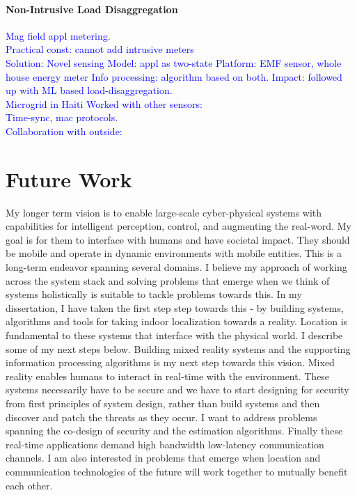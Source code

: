 \documentclass[10pt]{article}
\begin{document}
\paragraph{Non-Intrusive Load Disaggregation}
\textcolor{blue}{
Mag field appl metering.\\
Practical const: cannot add intrusive meters\\
Solution: Novel sensing
Model: appl as two-state
Platform: EMF sensor, whole house energy meter
Info processing: algorithm based on both.
Impact: followed up with ML based load-disaggregation.\\
Microgrid in Haiti
Worked with other sensors:\\
Time-sync, mac protocols.\\
Collaboration with outside:}

\section{Future Work}
My longer term vision is to enable large-scale cyber-physical systems with capabilities for intelligent perception, control, and augmenting the real-word. My goal is for them to interface with humans and have societal impact. They should be mobile and operate in dynamic environments with mobile entities. This is a long-term endeavor spanning several domains. I believe my approach of working across the system stack and solving problems that emerge when we think of systems holistically is suitable to tackle problems towards this. In my dissertation, I have taken the first step step towards this - by building systems, algorithms and tools for taking indoor localization towards a reality. Location is fundamental to these systems that interface with the physical world.  I describe some of my next steps below. 
Building mixed reality systems and the supporting information processing algorithms is my next step towards this vision. Mixed reality enables humans to interact in real-time with the environment. 
These systems necessarily have to be secure and we have to start designing for security from first principles of system design, rather than build systems and then discover and patch the threats as they occur. I want to address problems spanning the co-design of security and the estimation algorithms. Finally these real-time applications demand high bandwidth low-latency communication channels. I am also interested in problems that emerge when location and communication technologies of the future will work together to mutually benefit each other.
\end{document}
